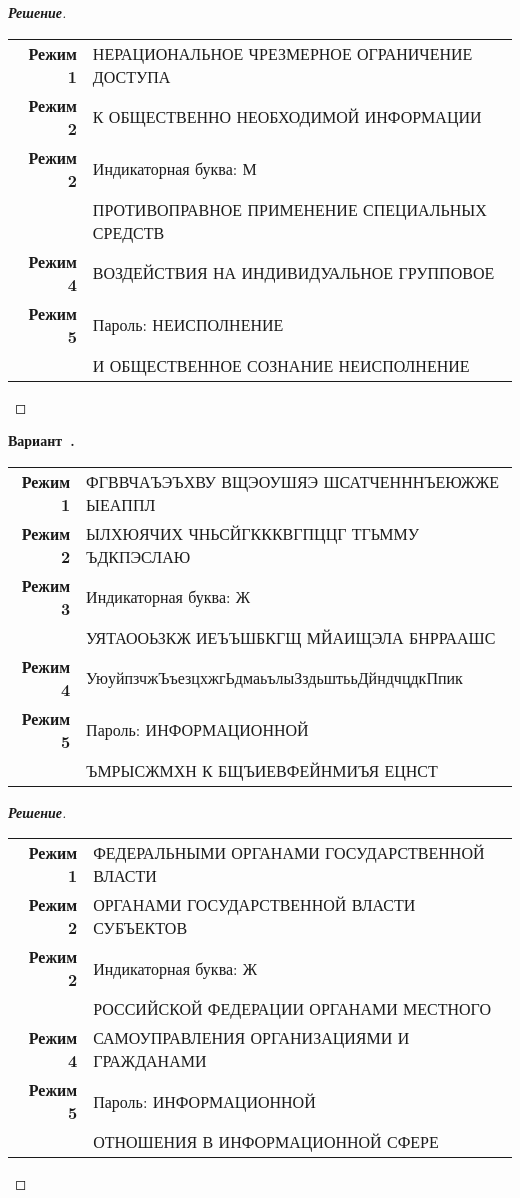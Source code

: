 \documentclass[a4paper,14pt]{extarticle}
\newcounter{exercise}[section]
\newenvironment{exercise}[1][]{\refstepcounter{exercise}\par\medskip
   \noindent\textbf{Вариант~\theexercise. #1}\\
   \noindent\makebox[\linewidth]{\rule{\textwidth}{1.25pt}}
   }
{\vspace{-2.5px}\mbox{}\newline \noindent\makebox[\linewidth]{\rule{\textwidth}{.5pt}}
}
\newenvironment{solution}
{\begin{proof}[\textbf{\textit{Решение}}]}
  {\end{proof}}
\begin{document}
\begin{solution}
\begin{table}[H]
	\centering
	\begin{tabular}{r l}\textbf{Режим 1}  & НЕРАЦИОНАЛЬНОЕ ЧРЕЗМЕРНОЕ ОГРАНИЧЕНИЕ ДОСТУПА \\ 
\textbf{Режим 2}  & К ОБЩЕСТВЕННО НЕОБХОДИМОЙ ИНФОРМАЦИИ \\ 
\textbf{Режим 2}  & Индикаторная буква: М \\ 
& ПРОТИВОПРАВНОЕ ПРИМЕНЕНИЕ СПЕЦИАЛЬНЫХ СРЕДСТВ \\ 
\textbf{Режим 4}  & ВОЗДЕЙСТВИЯ НА ИНДИВИДУАЛЬНОЕ ГРУППОВОЕ \\ 
\textbf{Режим 5}  & Пароль: НЕИСПОЛНЕНИЕ \\ 
& И ОБЩЕСТВЕННОЕ СОЗНАНИЕ НЕИСПОЛНЕНИЕ \\ 
	\end{tabular} 
\end{table}

\end{solution}
\begin{exercise}\begin{table}[H]
	\centering
	\begin{tabular}{r l}\textbf{Режим 1}  & ФГВВЧАЪЭЪХВУ ВЩЭОУШЯЭ ШСАТЧЕНННЪЕЮЖЖЕ ЫЕАППЛ \\ 
\textbf{Режим 2}  & ЫЛХЮЯЧИХ ЧНЬСЙГКККВГПЦЦГ ТГЬММУ ЪДКПЭСЛАЮ \\ 
\textbf{Режим 3}  & Индикаторная буква: Ж \\ 
& УЯТАООЬЗКЖ ИЕЪЪШБКГЩ МЙАИЩЭЛА БНРРААШС \\ 
\textbf{Режим 4}  & УюуйпзчжЪъезцхжгЬдмаьълыЗздьштььДйндчцдкПпик \\ 
\textbf{Режим 5}  & Пароль: ИНФОРМАЦИОННОЙ \\ 
& ЪМРЫСЖМХН К БЩЪИЕВФЕЙНМИЪЯ ЕЦНСТ \\ 
	\end{tabular} 
\end{table}

\end{exercise}
\begin{solution}
\begin{table}[H]
	\centering
	\begin{tabular}{r l}\textbf{Режим 1}  & ФЕДЕРАЛЬНЫМИ ОРГАНАМИ ГОСУДАРСТВЕННОЙ ВЛАСТИ \\ 
\textbf{Режим 2}  & ОРГАНАМИ ГОСУДАРСТВЕННОЙ ВЛАСТИ СУБЪЕКТОВ \\ 
\textbf{Режим 2}  & Индикаторная буква: Ж \\ 
& РОССИЙСКОЙ ФЕДЕРАЦИИ ОРГАНАМИ МЕСТНОГО \\ 
\textbf{Режим 4}  & САМОУПРАВЛЕНИЯ ОРГАНИЗАЦИЯМИ И ГРАЖДАНАМИ \\ 
\textbf{Режим 5}  & Пароль: ИНФОРМАЦИОННОЙ \\ 
& ОТНОШЕНИЯ В ИНФОРМАЦИОННОЙ СФЕРЕ \\ 
	\end{tabular} 
\end{table}

\end{solution}
\end{document}
